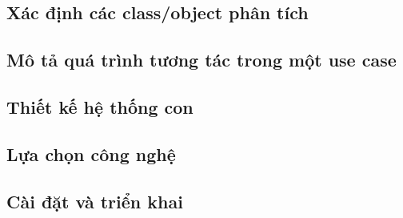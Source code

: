 \documentclass{article}
\begin{document}
  \subsection{Xác định các class/object phân tích}

  \subsection{Mô tả quá trình tương tác trong một use case}

  \subsection{Thiết kế hệ thống con}

  \subsection{Lựa chọn công nghệ}

  \subsection{Cài đặt và triển khai}
\end{document}
